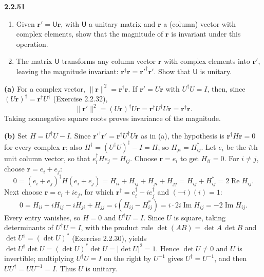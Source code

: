 \par\bigskip
\noindent\textbf{2.2.51}\quad
\begin{enumerate}
\item[(a)] Given $\mathbf{r}'=\mathsf{U}\mathbf{r}$, with $\mathsf{U}$ a
  unitary matrix and $\mathbf{r}$ a (column) vector with complex elements,
  show that the magnitude of $\mathbf{r}$ is invariant under this operation.
\item[(b)] The  matrix $\mathsf{U}$ transforms any column vector $\mathbf{r}$
  with complex elements into $\mathbf{r}'$, leaving the magnitude invariant:
  $\mathbf{r}^{\dagger}\mathbf{r}=\mathbf{r}'^{\dagger}\mathbf{r}'$. Show that
  $\mathsf{U}$ is unitary.
\end{enumerate}
\solution
\textbf{(a)} For a complex vector,
$\|\mathbf r\|^2=\mathbf r^\dagger\mathbf r$.
If $\mathbf r'=U\mathbf r$ with $U^\dagger U=I$, then, since
$(U\mathbf r)^\dagger=\mathbf r^\dagger U^\dagger$ (Exercise 2.2.32),
\[
\|\mathbf r'\|^2=(U\mathbf r)^\dagger U\mathbf r
=\mathbf r^\dagger U^\dagger U\mathbf r
=\mathbf r^\dagger\mathbf r.
\]
Taking nonnegative square roots proves invariance of the magnitude.

\textbf{(b)} 
Set $H=U^\dagger U-I$. Since
$\mathbf r'^\dagger\mathbf r'=\mathbf r^\dagger U^\dagger U\mathbf r$
as in (a), the hypothesis is
$\mathbf r^\dagger H\mathbf r=0$ for every complex $\mathbf r$;
also $H^\dagger=(U^\dagger U)^\dagger-I=H$, so $H_{ji}=H_{ij}^*$.
Let $e_i$ be the $i$th unit column vector, so that
$e_i^\dagger He_j=H_{ij}$.
Choose $\mathbf r=e_i$ to get $H_{ii}=0$.
For $i\ne j$, choose $\mathbf r=e_i+e_j$:
\[
0=(e_i+e_j)^\dagger H(e_i+e_j)=H_{ii}+H_{ij}+H_{ji}+H_{jj}
=H_{ij}+H_{ij}^*=2\operatorname{Re}H_{ij}.
\]
Next choose $\mathbf r=e_i+ie_j$, for which
$\mathbf r^\dagger=e_i^\dagger-ie_j^\dagger$ and $(-i)(i)=1$:
\[
0=H_{ii}+iH_{ij}-iH_{ji}+H_{jj}
=i(H_{ij}-H_{ij}^*)=i\cdot2i\operatorname{Im}H_{ij}
=-2\operatorname{Im}H_{ij}.
\]
Every entry vanishes, so $H=0$ and $U^\dagger U=I$.
Since $U$ is square, taking determinants of $U^\dagger U=I$, with
the product rule $\det(AB)=\det A\,\det B$ and
$\det U^\dagger=(\det U)^*$ (Exercise 2.2.30), yields
$\det U^\dagger\det U=(\det U)^*\det U=|\det U|^2=1$.
Hence $\det U\ne0$ and $U$ is invertible; multiplying $U^\dagger U=I$
on the right by $U^{-1}$ gives $U^\dagger=U^{-1}$, and then
$UU^\dagger=UU^{-1}=I$.
Thus $U$ is unitary.
